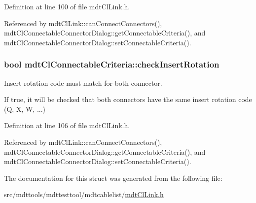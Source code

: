 Definition at line 100 of file mdt\-Cl\-Link.\-h.



Referenced by mdt\-Cl\-Link\-::can\-Connect\-Connectors(), mdt\-Cl\-Connectable\-Connector\-Dialog\-::get\-Connectable\-Criteria(), and mdt\-Cl\-Connectable\-Connector\-Dialog\-::set\-Connectable\-Criteria().

\hypertarget{structmdt_cl_connectable_criteria_a78661312682c0421bbc2b50255bb0229}{
\subsubsection[{check\-Insert\-Rotation}]{\setlength{\rightskip}{0pt plus 5cm}bool mdt\-Cl\-Connectable\-Criteria\-::check\-Insert\-Rotation}}\label{structmdt_cl_connectable_criteria_a78661312682c0421bbc2b50255bb0229}


Insert rotation code must match for both connector. 

If true, it will be checked that both connectors have the same insert rotation code (Q, X, W, ...) 

Definition at line 106 of file mdt\-Cl\-Link.\-h.



Referenced by mdt\-Cl\-Link\-::can\-Connect\-Connectors(), mdt\-Cl\-Connectable\-Connector\-Dialog\-::get\-Connectable\-Criteria(), and mdt\-Cl\-Connectable\-Connector\-Dialog\-::set\-Connectable\-Criteria().



The documentation for this struct was generated from the following file\-:\begin{DoxyCompactItemize}
\item 
src/mdttools/mdttesttool/mdtcablelist/\hyperlink{mdt_cl_link_8h}{mdt\-Cl\-Link.\-h}\end{DoxyCompactItemize}
